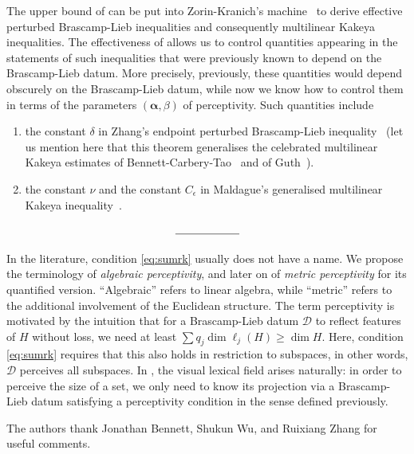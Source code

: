 \documentclass[a4paper,english]{amsart}
\theoremstyle{definition}
\newcommand{\bba}{\boldsymbol{\alpha}}
\newcommand{\1}{\mathbbm{1}}
\newcommand{\sD} {{\mathscr D}}
\begin{document}
\bigskip
{}
The upper bound of  can be put into Zorin-Kranich's machine~\cite[Theorem 1.3]{Zorin} to derive effective perturbed Brascamp-Lieb inequalities and consequently multilinear Kakeya inequalities.
The effectiveness of  allows us to control quantities appearing in the statements of such inequalities that were previously known to depend on the Brascamp-Lieb datum.
More precisely, previously, these quantities would depend obscurely on the Brascamp-Lieb datum, while now we know how to control them in terms of the parameters $(\bba,\beta)$ of perceptivity.
Such quantities include
\begin{enumerate}
\item the constant $\delta$ in Zhang's endpoint perturbed Brascamp-Lieb inequality~\cite[Theorem 1.11]{Zhang18} (let us mention here that this theorem generalises the celebrated multilinear Kakeya estimates of Bennett-Carbery-Tao~\cite[Theorem 1.15]{BCT06} and of Guth~\cite[Theorem 1.3]{Guth10}).
\item the constant $\nu$ and the constant $C_\epsilon$ in Maldague's generalised multilinear Kakeya inequality~\cite[Theorem 1.2]{Maldague22}.
\end{enumerate}


$$\rule{2cm}{0.4pt}$$



\bigskip

In the literature, condition \eqref{eq:sumrk} usually does not have a name.
We propose the terminology  of \emph{algebraic perceptivity}, and later on of \emph{metric perceptivity} for its quantified version. ``Algebraic'' refers  to linear algebra, while ``metric'' refers to the additional involvement of the Euclidean structure. The term perceptivity is motivated by the intuition that for a Brascamp-Lieb datum $\sD$ to reflect   features of $H$ without loss, we need at least $\sum q_{j} \dim \ell_{j}(H) \geq \dim H$.
Here, condition \eqref{eq:sumrk} requires that this also holds in restriction to subspaces, in other words, $\sD$ perceives all subspaces.
In , the visual lexical field arises naturally: in order to perceive the size of a set, we only need to know its projection via a Brascamp-Lieb datum satisfying a perceptivity condition in the  sense defined previously.

\bigskip
{}
The authors thank Jonathan Bennett,  Shukun Wu, and Ruixiang Zhang for useful comments.
\end{document}
